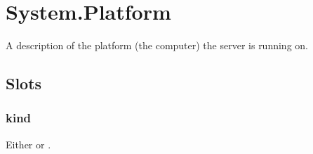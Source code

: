 \section{System.Platform}
A description of the platform (the computer) the server is running on.
\subsection{Slots}

\subsubsection{kind}
Either  or .

